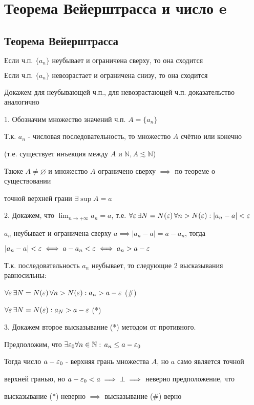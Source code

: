 \chapter{Теорема Вейерштрасса и число e}

\section{Теорема Вейерштрасса}

{
$ \text{Если ч.п. } \{ a_n \} \text{ неубывает и ограничена сверху, то она сходится } $

$ \text{Если ч.п. } \{ a_n \} \text{ невозрастает и ограничена снизу, то она сходится } $

\begin{mcproof}
    Докажем для неубывающей ч.п., для невозрастающей ч.п. доказательство аналогично

    1. Обозначим множество значений ч.п. $ A = \{ a_n \} $

    Т.к. $ a_n $ - числовая последовательность, то множество $ A $ счётно или конечно

    (т.е. существует инъекция между $ A $ и $ \mathbb{N}, A \lesssim \mathbb{N} $)

    Также $ A \ne \varnothing $ и множество $ A $ ограничено сверху $ \implies $ по теореме о существовании

    точной верхней грани $ \exists \sup A = a $

    2. Докажем, что $ \lim_{n \to +\infty} a_n = a $, т.е.
    $ \forall \varepsilon \, \exists N = N(\varepsilon) \, \forall n > N(\varepsilon): | a_n - a | < \varepsilon $

    $ a_n $ неубывает и ограничена сверху $ a \implies | a_n - a | = a - a_n $, тогда

    $ | a_n - a | < \varepsilon \iff a - a_n < \varepsilon \iff a_n > a - \varepsilon $

    Т.к. последовательность $ a_n $ неубывает, то следующие 2 высказывания равносильны:

    $ \forall \varepsilon \, \exists N = N(\varepsilon) \, \forall n > N(\varepsilon): a_n > a - \varepsilon $ (\#)

    $ \forall \varepsilon \, \exists N = N(\varepsilon) : a_{N} > a - \varepsilon $ (*)

    3. Докажем второе высказывание (*) методом от противного.

    Предположим, что $ \exists \varepsilon_0 \forall n \in \mathbb{N}: \, a_n \le a - \varepsilon_0 $

    Тогда число $ a - \varepsilon_0 $ - верхняя грань множества $ A $, но $ a $ само является точной

    верхней гранью, но $ a - \varepsilon_0 < a \implies \bot \implies $ неверно предположение, что

    высказывание (*) неверно $ \implies $ высказывание (\#) верно
\end{mcproof}
}

